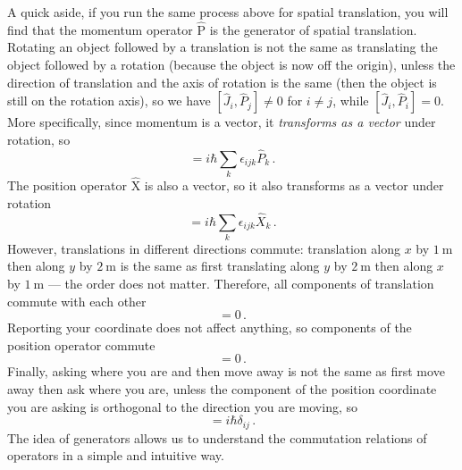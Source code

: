 \documentclass{article}
\theoremstyle{plain}\theoremheaderfont{\normalfont\itshape}\theorembodyfont{\rmfamily}\theoremseparator{.}\newtheorem*{rem}{Remark}\newtheorem*{ex}{Example}\newtheorem*{proof}{Proof}\newtheorem*{altp}{Alternative proof}
\theoremstyle{plain}\theoremheaderfont{\normalfont\bfseries}\theorembodyfont{\rmfamily}\theoremseparator{.}\newtheorem{thm}{Theorem}[section]\newtheorem{lem}[thm]{Lemma}\newtheorem{prop}[thm]{Proposition}\newtheorem*{cor}{Corollary}\newtheorem{defn}[thm]{Definition}\newtheorem{clm}[thm]{Claim}\newtheorem{clminproof}{Claim}\newtheorem*{law}{Law}\newtheorem{pos}[thm]{Postulate}
\theoremstyle{break}\theoremheaderfont{\normalfont\itshape}\theorembodyfont{\rmfamily}\theoremseparator{.\medskip}\newtheorem*{proofskip}{Proof}\newtheorem*{exs}{Examples}\newtheorem*{rems}{Remarks}
\theoremstyle{break}\theoremheaderfont{\normalfont\bfseries}\theorembodyfont{\rmfamily}\theoremseparator{.\medskip}\newtheorem{lemskip}[thm]{Lemma}\newtheorem{defnskip}[thm]{Definition}\newtheorem{propskip}[thm]{Proposition}\newtheorem{thmskip}[thm]{Theorem}
\numberwithin{equation}{section}
\newcommand{\unit}[1]{\ \mathrm{#1}}
\newcommand{\vb}[1]{\bm{\mathrm{#1}}}
\begin{document}
    A quick aside, if you run the same process above for spatial translation, you will find that the momentum operator \(\hat{\vb{P}}\) is the generator of spatial translation. Rotating an object followed by a translation is not the same as translating the object followed by a rotation (because the object is now off the origin), unless the direction of translation and the axis of rotation is the same (then the object is still on the rotation axis), so we have \([\hat{J}_i,\hat{P}_j]\ne 0\) for \(i\ne j\), while \([\hat{J}_i,\hat{P}_i]=0\). More specifically, since momentum is a vector, it \textit{transforms as a vector} under rotation, so
    \begin{equation}
        [\hat{J}_i,\hat{P}_j]=i\hbar\sum_k\epsilon_{ijk} \hat{P}_k\,.
    \end{equation}
    The position operator \(\hat{\vb{X}}\) is also a vector, so it also transforms as a vector under rotation
    \begin{equation}
        [\hat{J}_i,\hat{X}_j]=i\hbar\sum_k\epsilon_{ijk} \hat{X}_k\,.
    \end{equation}
    However, translations in different directions commute: translation along \(x\) by \(1\unit{m}\) then along \(y\) by \(2\unit{m}\) is the same as first translating along \(y\) by \(2\unit{m}\) then along \(x\) by \(1\unit{m}\) --- the order does not matter. Therefore, all components of translation commute with each other
    \begin{equation}
        [\hat{P}_i,\hat{P}_j]=0\,.
    \end{equation}
    Reporting your coordinate does not affect anything, so components of the position operator commute
    \begin{equation}
        [\hat{X}_i,\hat{X}_j]=0\,.
    \end{equation}
    Finally, asking where you are and then move away is not the same as first move away then ask where you are, unless the component of the position coordinate you are asking is orthogonal to the direction you are moving, so
    \begin{equation}
        [\hat{X}_i,\hat{P}_j]=i\hbar\delta_{ij}\,.
    \end{equation}
    The idea of generators allows us to understand the commutation relations of operators in a simple and intuitive way.
\end{document}
